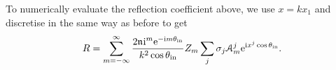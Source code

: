 \documentclass[12pt, a4paper]{article}
\begin{document}
To numerically evaluate the reflection coefficient above, we use $x = k x_1$ and discretise in the same way as before to get
\begin{equation}
  R =   \sum_{m=-\infty}^\infty \frac{2 \mathfrak n_{} \textrm{i}^m \textrm{e}^{-\textrm{i} m \theta_{\mathrm{in}}}}{k^2 \cos \theta_{\mathrm{in}}} Z_m  \sum_{j} \sigma_j \mathcal A_m^j \textrm{e}^{\textrm{i} x^j \cos \theta_{\mathrm{in}}}.
\end{equation}

\printbibliography

% 
% 
\end{document}
